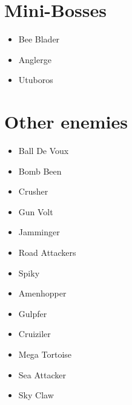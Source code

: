 \section{Mini-Bosses}
	\begin{itemize}
		\item Bee Blader \label{miniboss:Bee_Blader}
		\item Anglerge\label{miniboss:Anglerge}
		\item Utuboros\label{miniboss:Utuboros}
	\end{itemize}

\section{Other enemies}
\begin{itemize}
	\item Ball De Voux\label{enem:Ball_De_Voux}
	\item Bomb Been\label{enem:Bomb Been}
	\item Crusher\label{enem:Crusher}
	\item Gun Volt\label{enem:Gun_Volt}
	\item Jamminger\label{enem:Jamminger}
	\item Road Attackers\label{enem:Road_Attackers}
	\item Spiky\label{enem:Spiky}
	\item Amenhopper\label{enem:Amenhopper}
	\item Gulpfer\label{enem:Gulpfer}
	\item Cruiziler\label{enem:Cruiziler}
	\item Mega Tortoise\label{enem:Mega_Tortoise}
	\item Sea Attacker\label{enem:Sea_Attacker}
	\item Sky Claw\label{enem:Sky_Claw}
\end{itemize}
